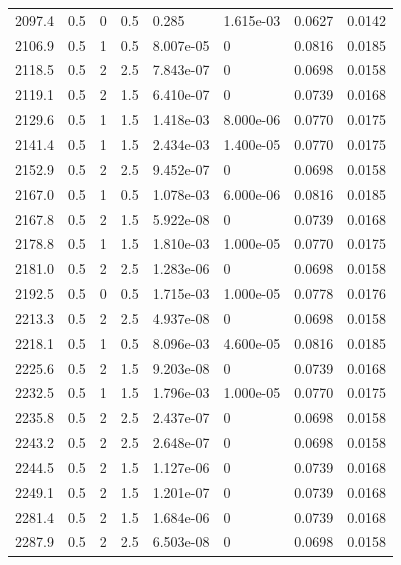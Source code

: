 \documentclass[preview]{standalone}
\begin{document}
{{{{{\begin{tabular}{L{1.2cm}C{1.2cm} C{0.3cm}C{0.5cm} C{1.4cm}C{1.4cm} C{1.4cm}C{1.4cm}}
  2097.4  &   0.5  & 0     & 0.5 &  0.285  & 1.615e-03  & 0.0627 &  0.0142   \\ 
  2106.9  &   0.5  & 1     & 0.5 &  8.007e-05  & 0  & 0.0816 &  0.0185   \\ 
  2118.5  &   0.5  & 2     & 2.5 &  7.843e-07  & 0  & 0.0698 &  0.0158   \\ 
  2119.1  &   0.5  & 2     & 1.5 &  6.410e-07  & 0  & 0.0739 &  0.0168   \\ 
  2129.6  &   0.5  & 1     & 1.5 &  1.418e-03  & 8.000e-06  & 0.0770 &  0.0175   \\ 
  2141.4  &   0.5  & 1     & 1.5 &  2.434e-03  & 1.400e-05  & 0.0770 &  0.0175   \\ 
  2152.9  &   0.5  & 2     & 2.5 &  9.452e-07  & 0  & 0.0698 &  0.0158   \\ 
  2167.0  &   0.5  & 1     & 0.5 &  1.078e-03  & 6.000e-06  & 0.0816 &  0.0185   \\ 
  2167.8  &   0.5  & 2     & 1.5 &  5.922e-08  & 0  & 0.0739 &  0.0168   \\ 
  2178.8  &   0.5  & 1     & 1.5 &  1.810e-03  & 1.000e-05  & 0.0770 &  0.0175   \\ 
  2181.0  &   0.5  & 2     & 2.5 &  1.283e-06  & 0  & 0.0698 &  0.0158   \\ 
  2192.5  &   0.5  & 0     & 0.5 &  1.715e-03  & 1.000e-05  & 0.0778 &  0.0176   \\ 
  2213.3  &   0.5  & 2     & 2.5 &  4.937e-08  & 0  & 0.0698 &  0.0158   \\ 
  2218.1  &   0.5  & 1     & 0.5 &  8.096e-03  & 4.600e-05  & 0.0816 &  0.0185   \\ 
  2225.6  &   0.5  & 2     & 1.5 &  9.203e-08  & 0  & 0.0739 &  0.0168   \\ 
  2232.5  &   0.5  & 1     & 1.5 &  1.796e-03  & 1.000e-05  & 0.0770 &  0.0175   \\ 
  2235.8  &   0.5  & 2     & 2.5 &  2.437e-07  & 0  & 0.0698 &  0.0158   \\ 
  2243.2  &   0.5  & 2     & 2.5 &  2.648e-07  & 0  & 0.0698 &  0.0158   \\ 
  2244.5  &   0.5  & 2     & 1.5 &  1.127e-06  & 0  & 0.0739 &  0.0168   \\ 
  2249.1  &   0.5  & 2     & 1.5 &  1.201e-07  & 0  & 0.0739 &  0.0168   \\ 
  2281.4  &   0.5  & 2     & 1.5 &  1.684e-06  & 0  & 0.0739 &  0.0168   \\ 
  2287.9  &   0.5  & 2     & 2.5 &  6.503e-08  & 0  & 0.0698 &  0.0158   \\ 

\end{tabular}}}}}}
\end{document}
